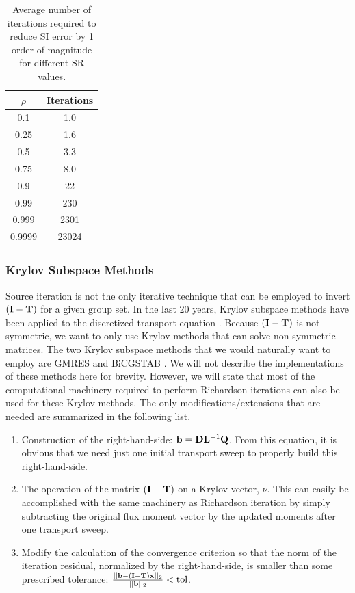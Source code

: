 \begin{table}
\caption{Average number of iterations required to reduce SI error by 1 order of magnitude for different SR values.}
\centering
\begin{tabular}{|c|c|}
\hline
$\rho$ & Iterations \\ \hline \hline
0.1 & 1.0 \\ 
0.25 & 1.6 \\ 
0.5 & 3.3 \\  
0.75 & 8.0 \\ 
0.9 & 22 \\ 
0.99 & 230 \\ 
0.999 & 2301 \\ 
0.9999 & 23024 \\
\hline
\end{tabular}
\label{tab::Sn_convergece_rates}
\end{table}

\subsubsection{Krylov Subspace Methods}
\label{sec::Sn_Solution_Iterative_GMRES}

Source iteration is not the only iterative technique that can be employed to invert $({\bf I} - {\bf T})$ for a given group set. In the last 20 years, Krylov subspace methods have been applied to the discretized transport equation \cite{oliveira1998preconditioned,guthrie1999gmres,patton2002application}. Because $({\bf I} - {\bf T})$ is not symmetric, we want to only use Krylov methods that can solve non-symmetric matrices. The two Krylov subspace methods that we would naturally want to employ are GMRES and BiCGSTAB \cite{saad1986gmres,saad2003iterative}. We will not describe the implementations of these methods here for brevity. However, we will state that most of the computational machinery required to perform Richardson iterations can also be used for these Krylov methods. The only modifications/extensions that are needed are summarized in the following list.

\begin{enumerate}
\item Construction of the right-hand-side: ${\bf b} = {\bf D} {\bf L}^{-1} {\bf Q}$. From this equation, it is obvious that we need just one initial transport sweep to properly build this right-hand-side.
\item The operation of the matrix $({\bf I} - {\bf T})$ on a Krylov vector, $\nu$. This can easily be accomplished with the same machinery as Richardson iteration by simply subtracting the original flux moment vector by the updated moments after one transport sweep.
\item Modify the calculation of the convergence criterion so that the norm of the iteration residual, normalized by the right-hand-side, is smaller than some prescribed tolerance:
$\frac{||{\bf b} - ({\bf I} - {\bf T}) {\bf x} ||_2}{||{\bf b}||_2} < \text{tol}$.
\end{enumerate}

